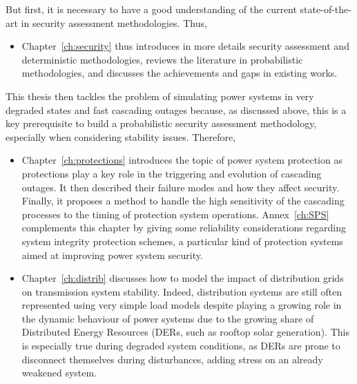 But first, it is necessary to have a good understanding of the current state-of-the-art in security assessment methodologies. Thus,

\begin{itemize}
    \item Chapter~\ref{ch:security} thus introduces in more details security assessment and deterministic methodologies, reviews the literature in probabilistic methodologies, and discusses the achievements and gaps in existing works.
\end{itemize}

This thesis then tackles the problem of simulating power systems in very degraded states and fast cascading outages because, as discussed above, this is a key prerequisite to build a probabilistic security assessment methodology, especially when considering stability issues. Therefore,

\begin{itemize}
    \item Chapter~\ref{ch:protections} introduces the topic of power system protection as protections play a key role in the triggering and evolution of cascading outages. It then described their failure modes and how they affect security. Finally, it proposes a method to handle the high sensitivity of the cascading processes to the timing of protection system operations. Annex~\ref{ch:SPS} complements this chapter by giving some reliability considerations regarding system integrity protection schemes, a particular kind of protection systems aimed at improving power system security.
    \item Chapter~\ref{ch:distrib} discusses how to model the impact of distribution grids on transmission system stability. Indeed, distribution systems are still often represented using very simple load models despite playing a growing role in the dynamic behaviour of power systems due to the growing share of Distributed Energy Resources (DERs, such as rooftop solar generation). This is especially true during degraded system conditions, as DERs are prone to disconnect themselves during disturbances, adding stress on an already weakened system.
\end{itemize}

